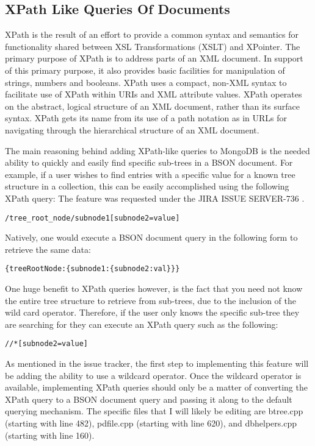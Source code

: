 \documentclass{dependencies/acm_proc_article-sp}
\begin{document}
\subsection{XPath Like Queries Of Documents}
XPath is the result of an effort to provide a common syntax and semantics for functionality shared between XSL Transformations (XSLT) and XPointer.
The primary purpose of XPath is to address parts of an XML document\cite{10}.
In support of this primary purpose, it also provides basic facilities for manipulation of strings, numbers and booleans.
XPath uses a compact, non-XML syntax to facilitate use of XPath within URIs and XML attribute values.
XPath operates on the abstract, logical structure of an XML document, rather than its surface syntax.
XPath gets its name from its use of a path notation as in URLs for navigating through the hierarchical structure of an XML document.

The main reasoning behind adding XPath-like queries to MongoDB is the needed ability to quickly and easily find specific sub-trees in a BSON document.
For example, if a user wishes to find entries with a specific value for a known tree structure in a collection, this can be easily accomplished using the following XPath query:
The feature was requested under the JIRA ISSUE SERVER-736 \cite{15}.

\begin{lstlisting}
/tree_root_node/subnode1[subnode2=value]
\end{lstlisting}
Natively, one would execute a BSON document query in the following form to retrieve the same data:
\begin{lstlisting}
{treeRootNode:{subnode1:{subnode2:val}}}
\end{lstlisting}
One huge benefit to XPath queries however, is the fact that you need not know the entire tree structure to retrieve from sub-trees, due to the inclusion of the wild card operator.
Therefore, if the user only knows the specific sub-tree they are searching for they can execute an XPath query such as the following:
\begin{lstlisting}
//*[subnode2=value]
\end{lstlisting}

As mentioned in the issue tracker, the first step to implementing this feature will be adding the ability to use a wildcard operator. Once the wildcard operator is available, implementing XPath queries should only be a matter of converting the XPath query to a BSON document query and passing it along to the default querying mechanism. The specific files that I will likely be editing are btree.cpp (starting with line 482), pdfile.cpp (starting with line 620), and dbhelpers.cpp (starting with line 160).
\end{document}
